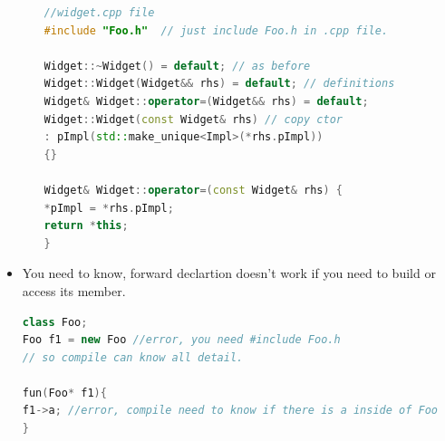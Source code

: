 \documentclass[a4paper,12pt,twoside]{book}
\begin{document}
\begin{itemize}
\begin{enumerate}
\begin{lstlisting}[frame=single, language=c++, mathescape=true]
//widget.cpp file
#include "Foo.h"  // just include Foo.h in .cpp file.

Widget::~Widget() = default; // as before
Widget::Widget(Widget&& rhs) = default; // definitions
Widget& Widget::operator=(Widget&& rhs) = default;
Widget::Widget(const Widget& rhs) // copy ctor
: pImpl(std::make_unique<Impl>(*rhs.pImpl))
{}

Widget& Widget::operator=(const Widget& rhs) {
*pImpl = *rhs.pImpl;
return *this;
}
\end{lstlisting}

\end{enumerate}

\item You need to know, forward declartion doesn't work if you need to build or access its member. 

\begin{lstlisting}[frame=single, language=c++]
class Foo;
Foo f1 = new Foo //error, you need #include Foo.h
// so compile can know all detail.

fun(Foo* f1){
f1->a; //error, compile need to know if there is a inside of Foo
}
\end{lstlisting}
\end{itemize}
\end{document}
